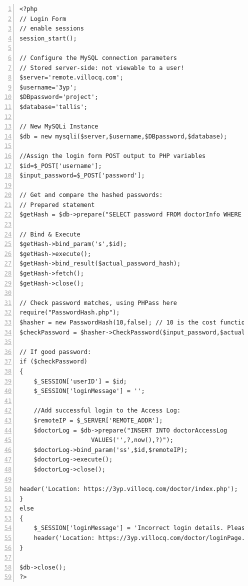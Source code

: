 \documentclass[11pt]{article}
\begin{document}
\begin{lstlisting}[numbers=left,frame=lines,label=doctor-login-form,showstringspaces=false]
<?php
// Login Form
// enable sessions
session_start();

// Configure the MySQL connection parameters
// Stored server-side: not viewable to a user!
$server='remote.villocq.com';
$username='3yp';
$DBpassword='project';
$database='tallis';

// New MySQLi Instance
$db = new mysqli($server,$username,$DBpassword,$database);

//Assign the login form POST output to PHP variables
$id=$_POST['username'];
$input_password=$_POST['password'];

// Get and compare the hashed passwords:
// Prepared statement
$getHash = $db->prepare("SELECT password FROM doctorInfo WHERE id=?");

// Bind & Execute
$getHash->bind_param('s',$id);
$getHash->execute();
$getHash->bind_result($actual_password_hash);
$getHash->fetch();
$getHash->close();

// Check password matches, using PHPass here
require("PasswordHash.php");
$hasher = new PasswordHash(10,false); // 10 is the cost function setting
$checkPassword = $hasher->CheckPassword($input_password,$actual_password_hash);

// If good password:
if ($checkPassword)  
{
    $_SESSION['userID'] = $id;
    $_SESSION['loginMessage'] = '';
    
    //Add successful login to the Access Log:
    $remoteIP = $_SERVER['REMOTE_ADDR'];
    $doctorLog = $db->prepare("INSERT INTO doctorAccessLog 
    				VALUES('',?,now(),?)");
    $doctorLog->bind_param('ss',$id,$remoteIP);
    $doctorLog->execute();
    $doctorLog->close();
    
header('Location: https://3yp.villocq.com/doctor/index.php'); 
}
else
{
    $_SESSION['loginMessage'] = 'Incorrect login details. Please try again.';
    header('Location: https://3yp.villocq.com/doctor/loginPage.php'); 
}

$db->close();
?>

\end{lstlisting}
\end{document}
